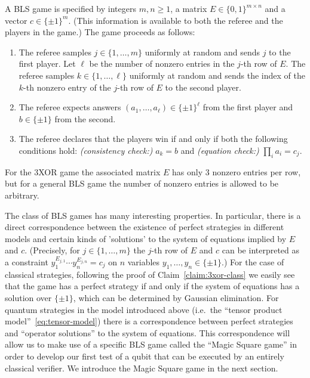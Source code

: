 \begin{definition}\label{def:bls-game}
A BLS game is specified by integers $m,n\geq 1$, a matrix $E\in \{0,1\}^{m\times n}$ and a vector $c\in\{\pm 1\}^m$. (This information is available to both the referee and the players in the game.) The game proceeds as follows:
\begin{enumerate}
\item The referee samples $j\in\{1,\ldots,m\}$ uniformly at random and sends $j$ to the first player. Let $\ell$ be the number of nonzero entries in the $j$-th row of $E$. The referee samples $k\in\{1,\ldots,\ell\}$ uniformly at random and sends the index of the $k$-th nonzero entry of the $j$-th row of $E$ to the second player. 
\item The referee expects answers $(a_1,\ldots,a_\ell)\in\{\pm 1\}^\ell$ from the first player and $b\in\{\pm 1\}$ from the second. 
\item The referee declares that the players win if and only if both the following conditions hold: \emph{(consistency check:)} $a_k = b$ and \emph{(equation check:)} $\prod_{i} a_i = c_j$. 
\end{enumerate}
\end{definition}

For the $3$XOR game the associated matrix $E$ has only $3$ nonzero entries per row, but for a general BLS game the number of nonzero entries is allowed to be arbitrary. 

The class of BLS games has many interesting properties. In particular, there is a  direct correspondence between the existence of perfect strategies in different models and certain kinds of 'solutions' to the system of equations implied by $E$ and $c$. (Precisely, for $j\in \{1,\ldots,m\}$ the $j$-th row of $E$ and $c$ can be interpreted as a constraint $y_1^{E_{j,1}} \cdots y_n^{E_{j,n}} = c_j$ on $n$ variables $y_1,\ldots,y_n \in \{\pm 1\}$.)
For the case of classical strategies, following the proof of Claim~\ref{claim:3xor-class} we easily see that the game has a perfect strategy if and only if the system of equations has a solution over $\{\pm 1\}$, which can be determined by Gaussian elimination. For quantum strategies in the model introduced above (i.e.\ the ``tensor product model''~\eqref{eq:tensor-model}) there is a correspondence between perfect strategies and ``operator solutions'' to the system of equations. This correspondence will allow us to make use of a specific BLS game called the ``Magic Square game'' in order to develop our first test of a qubit that can be executed by an entirely classical verifier. We introduce the Magic Square game in the next section. 

